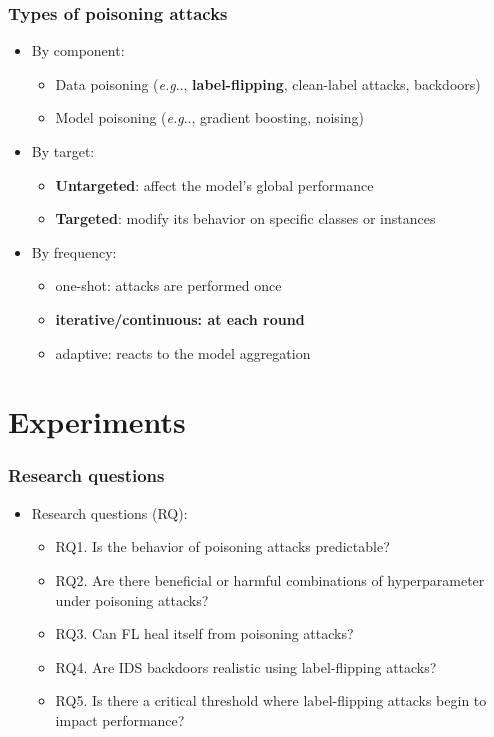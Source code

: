 \documentclass[color,t,presentation,english,aspectratio=169]{beamer}
\makeatletter
\DeclareRobustCommand\onedot{\futurelet\@let@token\@onedot}
\def\@onedot{\ifx\@let@token.\else.\null\fi\xspace}
\def\eg{\emph{e.g}\onedot} \def\Eg{\emph{E.g}\onedot}
\makeatother
\begin{document}
\begin{frame}
\frametitle{Types of poisoning attacks}
\begin{itemize}
    \item By component:
    \begin{itemize}
			\item Data poisoning (\eg, \textbf<2>{label-flipping}, clean-label attacks, backdoors)
			\item Model poisoning (\eg, gradient boosting, noising)
    \end{itemize}
		\item By target:
		\begin{itemize}
			\item \textbf<2>{Untargeted}: affect the model's global performance
			\item \textbf<2>{Targeted}: modify its behavior on specific classes or instances
		\end{itemize}
		\item By frequency:
		\begin{itemize}
			\item one-shot: attacks are performed once
			\item \textbf<2>{iterative/continuous: at each round}
			\item adaptive: reacts to the model aggregation
		\end{itemize}
	\end{itemize}
\end{frame}

\tableofcontentsimtatlantique

\section{Experiments}

\begin{frame}
	\frametitle{Research questions}
	\begin{itemize}
		\item Research questions (RQ):
    \begin{itemize}
			\item RQ1. Is the behavior of poisoning attacks predictable?
			\item RQ2. Are there beneficial or harmful combinations of hyperparameter under poisoning attacks?
			\item RQ3. Can FL heal itself from poisoning attacks?
			\item RQ4. Are IDS backdoors realistic using label-flipping attacks?
			\item RQ5. Is there a critical threshold where label-flipping attacks begin to impact performance?
    \end{itemize}
\end{itemize}
\end{frame}
\end{document}
